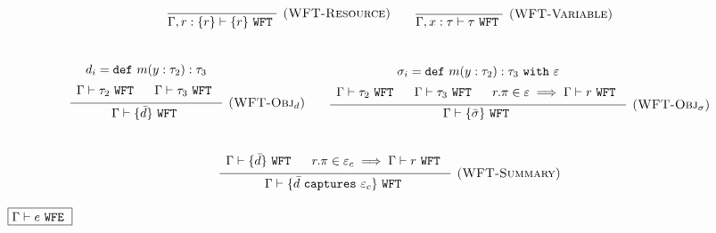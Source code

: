 \documentclass{llncs}
\newcommand{\keywadj}[1]{\mathtt{#1}}
\newcommand{\keyw}[1]{\keywadj{#1}~}
\newcommand{\kw}[1]{\keyw{ #1 }}
\begin{document}
\[
\begin{array}{c}

\infer[\textsc{(WFT-Resource)}]
	{ \Gamma, r : \{ r \} \vdash \{ r \}~\kw{WFT} }
	{ } 
	
	~~~~~~
	
	\infer[\textsc{(WFT-Variable)}]
		{ \Gamma, x : \tau \vdash \tau ~\kw{WFT} }
		{ }
	
\\[5ex]

\infer[\textsc{(WFT-Obj$_d$)}]
	{ \Gamma \vdash \{ \bar d \}~\kw{WFT} }
{{\def\arraystretch{1.4}
  \begin{array}{c}
d_i = \kw{def} m(y : \tau_2): \tau_3 \\
\Gamma \vdash \tau_2~\kw{WFT} ~~~~ \Gamma \vdash \tau_3~\kw{WFT}
  \end{array}}}
 
 
 ~~~~~~
  
\infer[\textsc{(WFT-Obj$_\sigma$)}]
	{ \Gamma \vdash \{ \bar \sigma \}~\kw{WFT} }
{{\def\arraystretch{1.4}
  \begin{array}{c}
\sigma_i = \kw{def} m(y : \tau_2): \tau_3 ~\kw{with} \varepsilon \\
\Gamma \vdash \tau_2~\kw{WFT} ~~~~ \Gamma \vdash \tau_3~\kw{WFT} ~~~~ r.\pi \in \varepsilon \implies \Gamma \vdash r~\kw{WFT}
  \end{array}}}
  
  
   
     \\[5ex]

\infer[\textsc{(WFT-Summary)}]
	{ \Gamma \vdash \{ \bar d ~\kw{captures} \varepsilon_c \}~\kw{WFT} }
{{\def\arraystretch{1.4}
  \begin{array}{c}
\Gamma \vdash \{ \bar d \} ~\kw{WFT} ~~~~ r.\pi \in \varepsilon_c \implies \Gamma \vdash r ~\kw{WFT}
  \end{array}}}
  

\end{array}
\]

\noindent
$\fbox{$\Gamma \vdash e~\kw{WFE}$}$
\end{document}
